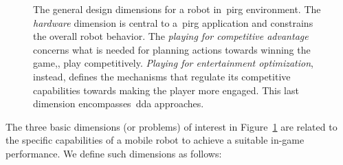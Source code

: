 \begin{figure}[h]
    \caption{The general design dimensions for a robot in~\gls{pirg} environment. The \textit{hardware} dimension is central to a~\gls{pirg} application and constrains the overall robot behavior. The \textit{playing for competitive advantage} concerns what is needed for planning actions towards winning the game,\ie, play competitively. \textit{Playing for entertainment optimization}, instead, defines the mechanisms that regulate its competitive capabilities towards making the player more engaged. This last dimension encompasses~\gls{dda} approaches.}
    \label{graph:PIRG_design_structure}
\end{figure}

The three basic dimensions (or problems) of interest in Figure~\ref{graph:PIRG_design_structure} are related to the specific capabilities of a mobile robot to achieve a suitable in-game performance. We define such dimensions as follows:

